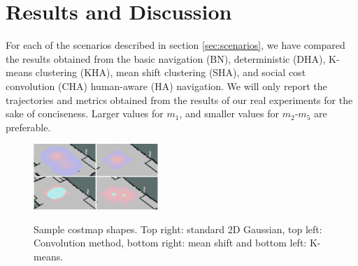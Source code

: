 \section{Results and Discussion}
\label{res}

For each of the scenarios described in section \ref{sec:scenarios}, we have compared the results obtained from the basic navigation (BN), deterministic (DHA), K-means clustering (KHA), mean shift clustering (SHA), and social cost convolution (CHA) human-aware (HA) navigation. We will only report the trajectories and metrics obtained from the results of our real experiments for the sake of conciseness. Larger values for $m_{1}$, and smaller values for $m_{2}$-$m_{5}$ are preferable.


\begin{figure}
\centering
{\includegraphics[width=0.42\textwidth]{pictures/all.eps}\label{fig:costmapPic}}%

\caption{Sample costmap shapes. Top right: standard 2D Gaussian, top left: Convolution method, bottom right: mean shift and bottom left: K-means.}
\label{fig:costmapPic}
\end{figure}


